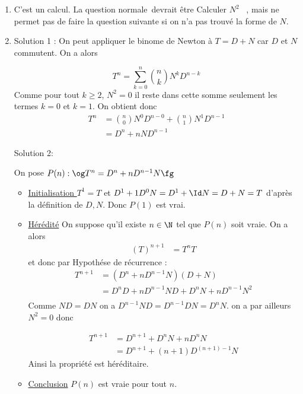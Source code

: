 \documentclass[a4paper, 11pt,reqno]{article}
\begin{document}
\begin{correction}
\begin{enumerate}
\item C'est un calcul. La question \og normale\fg\,  devrait être \og Calculer $N^2$ \fg \,  , mais ne permet pas de faire la question suivante si on n'a pas trouvé la forme de $N$. 

\item Solution 1 : On peut appliquer le binome de Newton à $T= D+N$   car $D$ et $N$ commutent. On a alors 

$$T^n =\sum_{k=0}^n \binom{n}{k} N^k D^{n-k}$$
Comme pour tout $k\geq 2$, $N^2=0$ il reste dans cette somme seulement les termes $k=0$ et $k=1$. On obtient donc 
\begin{align*}
T^n  &= \binom{n}{0} N^0 D^{n-0}+ \binom{n}{1} N^1 D^{n-1}\\
		&=D^n + nND^{n-1}
\end{align*}






Solution 2: 

On pose $P(n) : \og  T^n =D^n +n D^{n-1} N \fg$

\begin{itemize}
\item \underline{Initialisation }
$T^1 =T$ et $D^1+1D^0 N = D^1 +\Id N=D+N =T$ d'après la définition de $D,N$.
Donc $P(1) $ est vrai. 

\item \underline{Hérédité} On suppose qu'il existe $n\in \N$ tel que $P(n)$ soit vraie. 
On a alors 
\begin{align*}
 (T)^{n+1}&=  T^n  T
\end{align*}
et donc par Hypothése de récurrence : 
\begin{align*}
 T^{n+1}&= (D^n +nD^{n-1} N)(D+N)\\
 							&=  D^n D +n D^{n-1} N D + D^n N + nD^{n-1}N^2\\
\end{align*}
Comme $ND=DN$ on a $D^{n-1} N D= D^{n-1} DN  =D^{n} N$.  on a par ailleurs $N^2=0$ donc 

\begin{align*}
 T^{n+1}&=D^{n+1} +D^n N +nD^n N\\
 			&=D^{n+1} + (n+1) D^{(n+1)-1} N 
\end{align*}
Ainsi la propriété est héréditaire. 

\item \underline{Conclusion} $P(n)$ est vraie pour tout $n$. 
\end{itemize}


\end{enumerate}
\end{correction}
\end{document}
